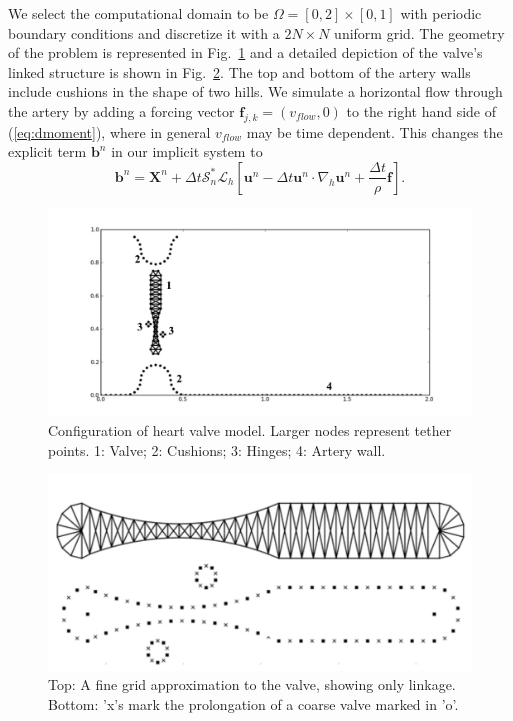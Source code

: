 \documentclass[preprint,12pt]{elsarticle}
\begin{document}
We select the computational domain to be $\Omega=[0,2]\times[0,1]$  with periodic boundary conditions and  discretize it with a $2N\times N$ uniform grid. The geometry of the problem is
represented in Fig.~\ref{fig:ValveGeometry} and a detailed depiction of the valve's linked structure is shown in Fig.~\ref{fig:Valve1}. The top and bottom of the artery walls include cushions in the shape of two hills. We simulate a horizontal flow through the artery by adding a forcing vector $\mathbf{f}_{j,k}=(v_{flow},0)$ to the right hand side of (\ref{eq:dmoment}), where in general $v_{flow}$ may be time dependent. This changes the explicit term $\mathbf{b}^n$ in our implicit system to
\begin{equation}
\mathbf{b}^n=\mathbf{X}^n + \Delta t\mathcal{S}^*_n\mathcal{L}_h
\left[ \mathbf{u}^n - \Delta t\mathbf{u}^n \cdot \nabla_h \mathbf{u}^n + \frac{\Delta t}{\rho} \mathbf{f} \right].
\end{equation}
\begin{figure}[!b]
  \begin{center}
   \includegraphics[bb=1in .3in 11.5in 5.85in,width=5.25in,clip]{ValveGeometry.pdf}
  \end{center}
  \caption{\small Configuration of heart valve model. Larger nodes represent tether points. 1: Valve; 2: Cushions; 3: Hinges; 4: Artery wall.}
  \label{fig:ValveGeometry}
\end{figure}
\begin{figure}[!b]
  \begin{center}
    \includegraphics[bb=0in 0in 7.25in 3.3in,width=5.25in,clip]{Valve1.pdf}
  \end{center}
  \caption{\small Top: A fine grid approximation to the valve, showing only linkage. Bottom: 'x's mark the prolongation of a coarse valve marked in 'o'.}
  \label{fig:Valve1}
\end{figure}
\end{document}
